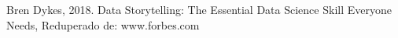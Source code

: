 \documentclass[twoside,twocolumn]{article}
\begin{document}


\begin{thebibliography}{99} 

\bibitem[1]{}
\newblock Bren Dykes, 2018. Data Storytelling: The Essential Data Science Skill Everyone Needs, Reduperado de: www.forbes.com




\end{thebibliography}


\end{document}
